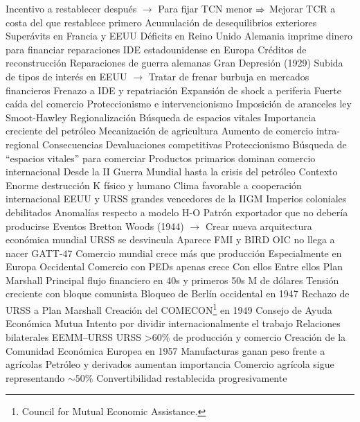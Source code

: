 \documentclass{nuevotema}
\begin{document}
\begin{esquemal}
				\4[] Incentivo a restablecer después
				\4[] $\to$ Para fijar TCN menor
				\4[] $\Rightarrow$ Mejorar TCR a costa del que restablece primero
				\4 Acumulación de desequilibrios exteriores
				\4[] Superávits en Francia y EEUU
				\4[] Déficits en Reino Unido
				\4[] Alemania imprime dinero para financiar reparaciones
				\4 IDE estadounidense en Europa
				\4 Créditos de reconstrucción
				\4 Reparaciones de guerra alemanas
				\4 Gran Depresión (1929)
				\4[] Subida de tipos de interés en EEUU
				\4[] $\to$ Tratar de frenar burbuja en mercados financieros
				\4[] Frenazo a IDE y repatriación
				\4[] Expansión de shock a periferia
				\4[] Fuerte caída del comercio
				\4 Proteccionismo e intervencionismo
				\4[] Imposición de aranceles ley Smoot-Hawley
				\4 Regionalización
				\4[] Búsqueda de espacios vitales
				\4 Importancia creciente del petróleo
				\4[] Mecanización de agricultura
				\4[] Aumento de comercio intra-regional
			\3 Consecuencias
				\4 Devaluaciones competitivas
				\4 Proteccionismo
				\4 Búsqueda de ``espacios vitales'' para comerciar
				\4 Productos primarios dominan comercio internacional
		\2 Desde la II Guerra Mundial hasta la crisis del petróleo
			\3 Contexto
				\4 Enorme destrucción K físico y humano
				\4 Clima favorable a cooperación internacional
				\4 EEUU y URSS grandes vencedores de la IIGM
				\4 Imperios coloniales debilitados
				\4 Anomalías respecto a modelo H-O
				\4[] Patrón exportador que no debería producirse
			\3 Eventos
				\4 Bretton Woods (1944)
				\4[] $\to$ Crear nueva arquitectura económica mundial
				\4[] URSS se desvincula
				\4[] Aparece FMI y BIRD
				\4[] OIC no llega a nacer
				\4[] GATT-47
				\4 Comercio mundial crece más que producción
				\4[] Especialmente en Europa Occidental
				\4 Comercio con PEDs apenas crece
				\4[] Con ellos
				\4[] Entre ellos
				\4 Plan Marshall
				\4[] Principal flujo financiero en 40s y primeros 50s
				 M de dólares
				\4 Tensión creciente con bloque comunista
				\4[] Bloqueo de Berlín occidental en 1947
				\4[] Rechazo de URSS a Plan Marshall
				\4 Creación del COMECON\footnote{Council for Mutual Economic Assistance.} en 1949
				\4[] Consejo de Ayuda Económica Mutua
				\4[] Intento por dividir internacionalmente el trabajo
				\4[] Relaciones bilaterales EEMM--URSS
				\4[] URSS >60\% de producción y comercio
				\4 Creación de la Comunidad Económica Europea en 1957
				\4 Manufacturas ganan peso frente a agrícolas
				\4 Petróleo y derivados aumentan importancia
				\4 Comercio agrícola sigue representando $\sim 50\%$
				\4 Convertibilidad restablecida progresivamente

\end{esquemal}
\end{document}
